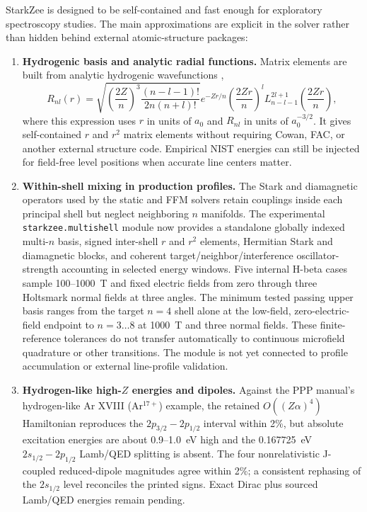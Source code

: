 \documentclass[11pt,a4paper]{article}
\numberwithin{equation}{section}
\begin{document}
StarkZee is designed to be self-contained and fast enough for exploratory spectroscopy studies.  The main approximations are explicit in the solver rather than hidden behind external atomic-structure packages:
\begin{enumerate}
    \item \textbf{Hydrogenic basis and analytic radial functions.}
    Matrix elements are built from analytic hydrogenic wavefunctions \cite{bethesalpeter},
    \begin{equation}
    R_{nl}(r) = \sqrt{\left(\frac{2Z}{n}\right)^3 \frac{(n-l-1)!}{2n(n+l)!}} e^{-Zr/n} \left(\frac{2Zr}{n}\right)^l L_{n-l-1}^{2l+1}\left(\frac{2Zr}{n}\right),
    \end{equation}
    where this expression uses $r$ in units of $a_0$ and $R_{nl}$ in units of
    $a_0^{-3/2}$. It gives self-contained $r$ and $r^2$ matrix elements without requiring Cowan, FAC, or another external structure code. Empirical NIST energies can still be injected for field-free level positions when accurate line centers matter.

    \item \textbf{Within-shell mixing in production profiles.}
    The Stark and diamagnetic operators used by the static and FFM solvers retain couplings inside each principal shell but neglect neighboring $n$ manifolds.  The experimental \texttt{starkzee.multishell} module now provides a standalone globally indexed multi-$n$ basis, signed inter-shell $r$ and $r^2$ elements, Hermitian Stark and diamagnetic blocks, and coherent target/neighbor/interference oscillator-strength accounting in selected energy windows.  Five internal H-beta cases sample 100--1000~T and fixed electric fields from zero through three Holtsmark normal fields at three angles.  The minimum tested passing upper basis ranges from the target $n=4$ shell alone at the low-field, zero-electric-field endpoint to $n=3\ldots8$ at 1000~T and three normal fields.  These finite-reference tolerances do not transfer automatically to continuous microfield quadrature or other transitions.  The module is not yet connected to profile accumulation or external line-profile validation.

    \item \textbf{Hydrogen-like high-$Z$ energies and dipoles.}
    Against the PPP manual's hydrogen-like Ar XVIII (Ar$^{17+}$) example, the retained $O((Z\alpha)^4)$ Hamiltonian reproduces the $2p_{3/2}-2p_{1/2}$ interval within 2\%, but absolute excitation energies are about 0.9--1.0~eV high and the 0.167725~eV $2s_{1/2}-2p_{1/2}$ Lamb/QED splitting is absent. The four nonrelativistic J-coupled reduced-dipole magnitudes agree within 2\%; a consistent rephasing of the $2s_{1/2}$ level reconciles the printed signs. Exact Dirac plus sourced Lamb/QED energies remain pending.


\end{enumerate}
\end{document}
